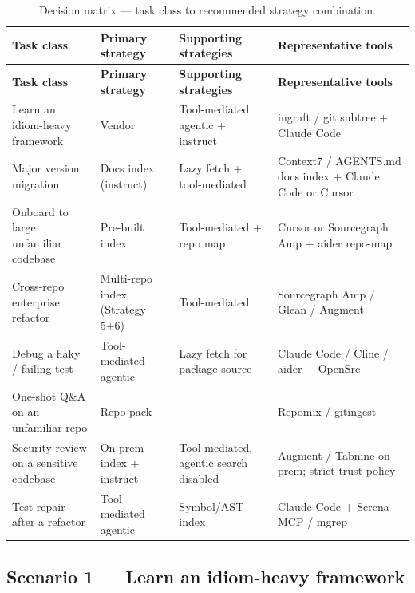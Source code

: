 \documentclass[
  11pt,
  letterpaper,
  numbers=noendperiod,
  parskip=half]{scrartcl}
\begin{document}
\begin{longtable}[]{@{}
  >{\raggedright\arraybackslash}p{}
  >{\raggedright\arraybackslash}p{}
  >{\raggedright\arraybackslash}p{}
  >{\raggedright\arraybackslash}p{}@{}}
\caption{Decision matrix --- task class to recommended strategy
combination.}\label{tbl-fit-matrix}\tabularnewline
\toprule\noalign{}
\textbf{Task class} & \textbf{Primary strategy} & \textbf{Supporting strategies} & \textbf{Representative tools}\\
\midrule\noalign{}
\endfirsthead
\toprule\noalign{}
\textbf{Task class} & \textbf{Primary strategy} & \textbf{Supporting strategies} & \textbf{Representative tools}\\
\midrule\noalign{}
\endhead
\bottomrule\noalign{}
\endlastfoot
Learn an idiom-heavy framework & Vendor & Tool-mediated agentic + instruct & ingraft / git subtree + Claude Code\\
Major version migration & Docs index (instruct) & Lazy fetch + tool-mediated & Context7 / AGENTS.md docs index + Claude Code or Cursor\\
Onboard to large unfamiliar codebase & Pre-built index & Tool-mediated + repo map & Cursor or Sourcegraph Amp + aider repo-map\\
Cross-repo enterprise refactor & Multi-repo index (Strategy 5+6) & Tool-mediated & Sourcegraph Amp / Glean / Augment\\
Debug a flaky / failing test & Tool-mediated agentic & Lazy fetch for package source & Claude Code / Cline / aider + OpenSrc\\
One-shot Q\&A on an unfamiliar repo & Repo pack & --- & Repomix / gitingest\\
Security review on a sensitive codebase & On-prem index + instruct & Tool-mediated, agentic search disabled & Augment / Tabnine on-prem; strict trust policy\\
Test repair after a refactor & Tool-mediated agentic & Symbol/AST index & Claude Code + Serena MCP / mgrep\\
\end{longtable}

\subsection{Scenario 1 --- Learn an idiom-heavy
framework}\label{sec-fit-scenario-effect}
\end{document}
